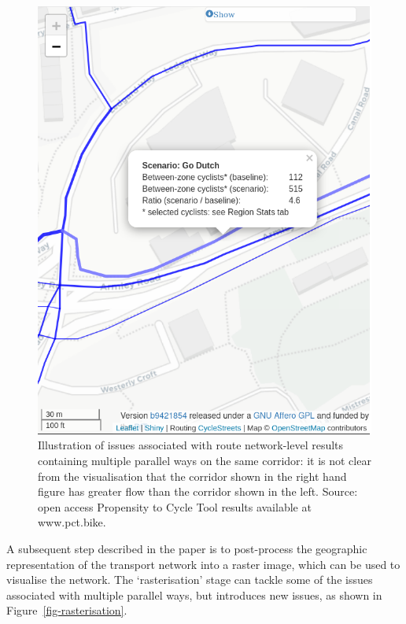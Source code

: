 \documentclass[
  letterpaper,
  DIV=11,
  numbers=noendperiod]{scrartcl}
\begin{document}
\begin{figure}
\begin{minipage}[t]{0.50\linewidth}
{{\includegraphics{images/armley-road-narrow.png}

}

}

\subcaption{\label{fig-armley-road}}
\end{minipage}%

\caption{\label{fig-pct}Illustration of issues associated with route
network-level results containing multiple parallel ways on the same
corridor: it is not clear from the visualisation that the corridor shown
in the right hand figure has greater flow than the corridor shown in the
left. Source: open access Propensity to Cycle Tool results available at
www.pct.bike.}

\end{figure}

A subsequent step described in the paper is to post-process the
geographic representation of the transport network into a raster image,
which can be used to visualise the network. The `rasterisation' stage
can tackle some of the issues associated with multiple parallel ways,
but introduces new issues, as shown in Figure~\ref{fig-rasterisation}.
\end{document}
